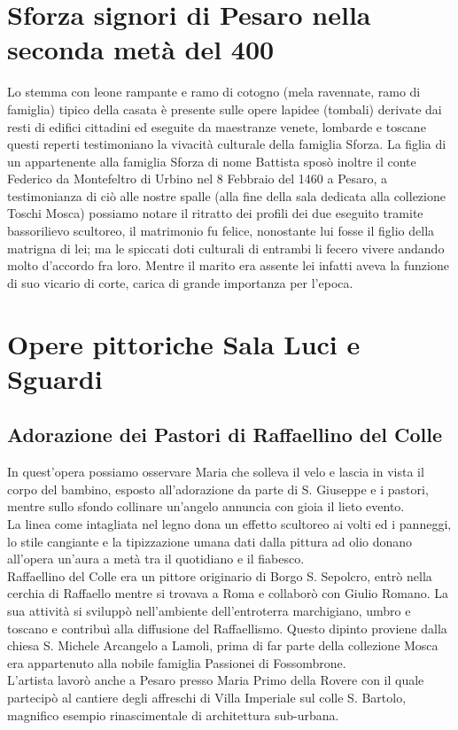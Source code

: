 \documentclass[hidelinks,12pt,a4paper]{article}
\begin{document}
\begin{flushleft}
		\section{Sforza signori di Pesaro nella seconda metà del 400}
		Lo stemma con leone rampante e ramo di cotogno (mela ravennate, ramo di famiglia) tipico della casata è presente sulle opere lapidee (tombali) derivate dai resti di edifici cittadini ed eseguite da maestranze venete, lombarde e toscane questi reperti testimoniano la vivacità culturale della famiglia Sforza. La figlia di un appartenente alla famiglia Sforza di nome Battista sposò inoltre il conte Federico da Montefeltro di Urbino nel 8 Febbraio del 1460 a Pesaro, a testimonianza di ciò alle nostre spalle (alla fine della sala dedicata alla collezione Toschi Mosca) possiamo notare il ritratto dei profili dei due eseguito tramite bassorilievo scultoreo, il matrimonio fu felice, nonostante lui fosse il figlio della matrigna di lei; ma le spiccati doti culturali di entrambi li fecero vivere andando molto d'accordo fra loro. Mentre il marito era assente lei infatti aveva la funzione di suo vicario di corte, carica di grande importanza per l'epoca.
		
		\section{Opere pittoriche Sala Luci e Sguardi} 
		
		\subsection{Adorazione dei Pastori di Raffaellino del Colle}
		In quest'opera possiamo osservare Maria che solleva il velo e lascia in vista il corpo del bambino, esposto all'adorazione da parte di S. Giuseppe e i pastori, mentre sullo sfondo collinare un'angelo annuncia con gioia il lieto evento.\\
		La linea come intagliata nel legno dona un effetto scultoreo ai volti ed i panneggi, lo stile cangiante e la tipizzazione umana dati dalla pittura ad olio donano all'opera un'aura a metà tra il quotidiano e il fiabesco.\\
		Raffaellino del Colle era un pittore originario di Borgo S. Sepolcro, entrò nella cerchia di Raffaello mentre si trovava a Roma e collaborò con Giulio Romano. La sua attività si sviluppò nell'ambiente dell'entroterra marchigiano, umbro e toscano e contribuì alla diffusione del Raffaellismo. Questo dipinto proviene dalla chiesa S. Michele Arcangelo a Lamoli, prima di far parte della collezione Mosca era appartenuto alla nobile famiglia Passionei di Fossombrone.\\
		L'artista lavorò anche a Pesaro presso Maria Primo della Rovere con il quale partecipò al cantiere degli affreschi di Villa Imperiale sul colle S. Bartolo, magnifico esempio rinascimentale di architettura sub-urbana.
		

\end{flushleft}
\end{document}
